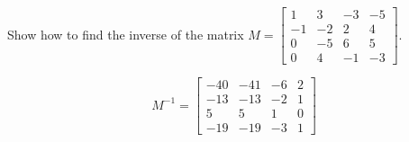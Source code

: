 
\begin{exerciseStatement}


Show how to find the inverse of the matrix \(M= \left[\begin{array}{cccc}
1 & 3 & -3 & -5 \\
-1 & -2 & 2 & 4 \\
0 & -5 & 6 & 5 \\
0 & 4 & -1 & -3
\end{array}\right] \).


\end{exerciseStatement}
    
\begin{exerciseAnswer} 
\[M^{-1}= \left[\begin{array}{cccc}
-40 & -41 & -6 & 2 \\
-13 & -13 & -2 & 1 \\
5 & 5 & 1 & 0 \\
-19 & -19 & -3 & 1
\end{array}\right] \]
\end{exerciseAnswer}
    
